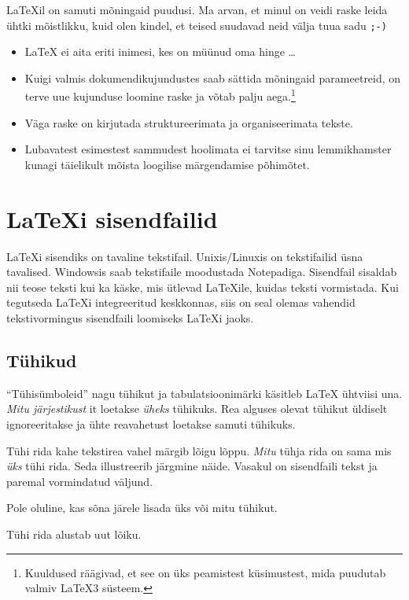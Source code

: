 \LaTeX il on samuti mõningaid puudusi. Ma arvan, et minul on veidi raske
leida ühtki mõistlikku, kuid olen kindel, et teised suudavad neid välja
tuua sadu \texttt{;-)}
\begin{itemize}
\item \LaTeX{} ei aita eriti inimesi, kes on müünud oma hinge
  \ldots
\item Kuigi valmis dokumendikujundustes saab sättida
  mõningaid parameetreid, on terve uue kujunduse loomine raske ja võtab
  palju aega.\footnote{Kuuldused räägivad, et see on üks
  peamistest küsimustest, mida puudutab valmiv \LaTeX 3
  süsteem.}
\item Väga raske on kirjutada struktureerimata ja organiseerimata
  tekste.
\item Lubavatest esimestest sammudest hoolimata ei tarvitse sinu
  lemmikhamster kunagi täielikult mõista loogilise märgendamise
  põhimõtet.
\end{itemize}

\section{\LaTeX i sisendfailid}

\LaTeX i sisendiks on tavaline tekstifail.
Unixis/Linuxis on tekstifailid üsna tavalised. Windowsis saab
tekstifaile moodustada Notepadiga. Sisendfail sisaldab nii teose teksti
kui ka käske, mis ütlevad \LaTeX ile, kuidas teksti vormistada. Kui
tegutseda \LaTeX i integreeritud keskkonnas, siis on seal olemas
vahendid tekstivormingus sisendfaili loomiseks \LaTeX i jaoks.

\subsection{Tühikud}

"`Tühisümboleid"' nagu tühikut ja tabulatsioonimärki käsitleb \LaTeX{}
ühtviisi una. \emph{Mitu järjestikust} it
loetakse \emph{üheks} tühikuks. Rea alguses olevat tühikut üldiselt
ignoreeritakse ja ühte reavahetust loetakse samuti
tühikuks.

Tühi rida kahe tekstirea vahel märgib lõigu lõppu. \emph{Mitu} tühja
rida on sama mis \emph{üks} tühi rida. Seda illustreerib järgmine näide.
Vasakul on sisendfaili tekst ja paremal vormindatud väljund.

\begin{example}
Pole oluline, kas
sõna järele lisada üks
või mitu       tühikut.

Tühi rida alustab uut
lõiku.
\end{example}

